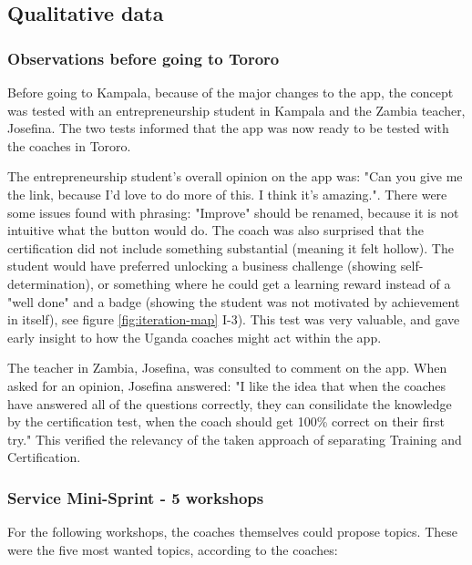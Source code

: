 \subsection{Qualitative data}


  \subsubsection{Observations before going to Tororo}
  Before going to Kampala, because of the major changes to the app, the concept was tested with an entrepreneurship student in Kampala and the Zambia teacher, Josefina. The two tests informed that the app was now ready to be tested with the coaches in Tororo.

  The entrepreneurship student's overall opinion on the app was: "Can you give me the link, because I'd love to do more of this. I think it's amazing.". There were some issues found with phrasing: "Improve" should be renamed, because it is not intuitive what the button would do. The coach was also surprised that the certification did not include something substantial (meaning it felt hollow). The student would have preferred unlocking a business challenge (showing self-determination), or something where he could get a learning reward instead of a "well done" and a badge (showing the student was not motivated by achievement in itself), see figure \ref{fig:iteration-map} I-3). This test was very valuable, and gave early insight to how the Uganda coaches might act within the app.

  The teacher in Zambia, Josefina, was consulted to comment on the app. When asked for an opinion, Josefina answered: "I like the idea that when the coaches have answered all of the questions correctly, they can consilidate the knowledge by the certification test, when the coach should get 100\% correct on their first try." This verified the relevancy of the taken approach of separating Training and Certification.

  \subsubsection{Service Mini-Sprint - 5 workshops}

  For the following workshops, the coaches themselves could propose topics. These were the five most wanted topics, according to the coaches:

